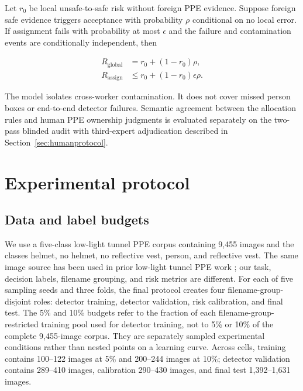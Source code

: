 \documentclass[iicol,pdflatex,sn-mathphys-num]{sn-jnl}
\begin{document}
Let $r_0$ be local unsafe-to-safe risk without foreign PPE evidence. Suppose foreign safe evidence triggers acceptance with probability $\rho$ conditional on no local error. If assignment fails with probability at most $\epsilon$ and the failure and contamination events are conditionally independent, then

\begin{equation}
\begin{aligned}
R_{\mathrm{global}}&=r_0+(1-r_0)\rho,\\
R_{\mathrm{assign}}&\leq r_0+(1-r_0)\epsilon\rho.
\end{aligned}
\label{eq:contamination}
\end{equation}

The model isolates cross-worker contamination. It does not cover missed person boxes or end-to-end detector failures. Semantic agreement between the allocation rules and human PPE ownership judgments is evaluated separately on the two-pass blinded audit with third-expert adjudication described in Section~\ref{sec:humanprotocol}.

\section{Experimental protocol}\label{sec:experiments}

\subsection{Data and label budgets}

We use a five-class low-light tunnel PPE corpus containing 9,455 images and the classes helmet, no helmet, no reflective vest, person, and reflective vest. The same image source has been used in prior low-light tunnel PPE work \cite{wang2023lowlight}; our task, decision labels, filename grouping, and risk metrics are different. For each of five sampling seeds and three folds, the final protocol creates four filename-group-disjoint roles: detector training, detector validation, risk calibration, and final test. The 5\% and 10\% budgets refer to the fraction of each filename-group-restricted training pool used for detector training, not to 5\% or 10\% of the complete 9,455-image corpus. They are separately sampled experimental conditions rather than nested points on a learning curve. Across cells, training contains 100--122 images at 5\% and 200--244 images at 10\%; detector validation contains 289--410 images, calibration 290--430 images, and final test 1,392--1,631 images.
\end{document}
